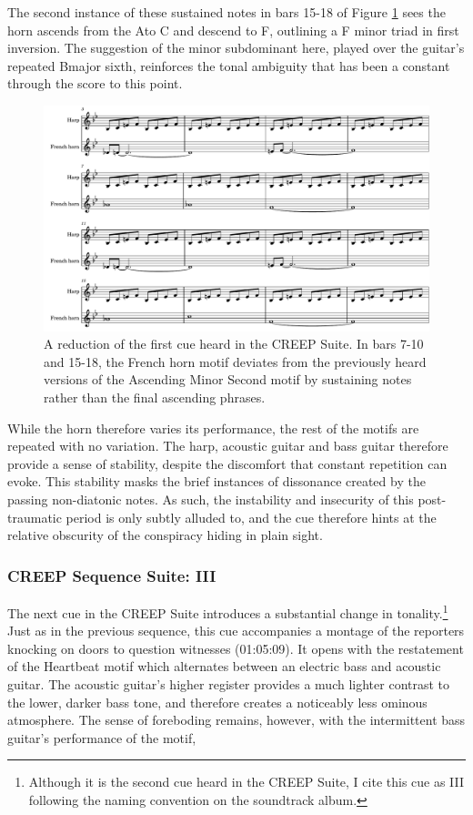 The second instance of these sustained notes in bars 15-18 of Figure \ref{fig:president-creep-I} sees the horn ascends from the A\flat to C and descend to F, outlining a F minor triad in first inversion.
The suggestion of the minor subdominant here, played over the guitar's repeated B\flat major sixth, reinforces the tonal ambiguity that has been a constant through the score to this point.
\begin{figure}
    \centering
    \includegraphics[width=1\linewidth]{img/president-creep-I.pdf}
    \caption{A reduction of the first cue heard in the CREEP Suite. In bars 7-10 and 15-18, the French horn motif deviates from the previously heard versions of the Ascending Minor Second motif by sustaining notes rather than the final ascending phrases.}
    \label{fig:president-creep-I}
\end{figure}
While the horn therefore varies its performance, the rest of the motifs are repeated with no variation.
The harp, acoustic guitar and bass guitar therefore provide a sense of stability, despite the discomfort that constant repetition can evoke.
This stability masks the brief instances of dissonance created by the passing non-diatonic notes.
As such, the instability and insecurity of this post-traumatic period is only subtly alluded to, and the cue therefore hints at the relative obscurity of the conspiracy hiding in plain sight.


\subsubsection{CREEP Sequence Suite: III}

The next cue in the CREEP Suite introduces a substantial change in tonality.\footnote{Although it is the second cue heard in the CREEP Suite, I cite this cue as III following the naming convention on the soundtrack album.}
Just as in the previous sequence, this cue accompanies a montage of the reporters knocking on doors to question witnesses (01:05:09).
It opens with the restatement of the Heartbeat motif which alternates between an electric bass and acoustic guitar.
The acoustic guitar's higher register provides a much lighter contrast to the lower, darker bass tone, and therefore creates a noticeably less ominous atmosphere.
The sense of foreboding remains, however, with the intermittent bass guitar's performance of the motif, 

